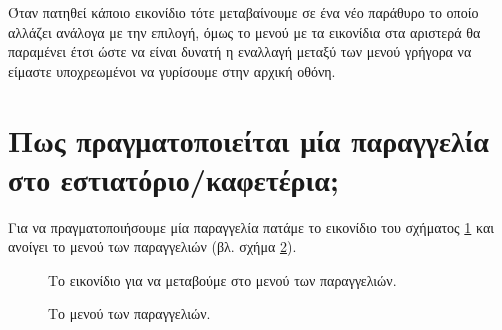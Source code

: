 \documentclass[a4paper,titlepage,twoside,12pt,leqno]{article}
\begin{document}

Όταν πατηθεί κάποιο εικονίδιο τότε μεταβαίνουμε σε ένα νέο παράθυρο το οποίο αλλάζει ανάλογα με την επιλογή, όμως το μενού με τα εικονίδια στα αριστερά θα παραμένει έτσι ώστε να είναι δυνατή η εναλλαγή μεταξύ των μενού γρήγορα να είμαστε υποχρεωμένοι να γυρίσουμε στην αρχική οθόνη.


\section{Πως πραγματοποιείται μία παραγγελία στο εστιατόριο/καφετέρια;}

Για να πραγματοποιήσουμε μία παραγγελία πατάμε το εικονίδιο του σχήματος \ref{fig:icon:order} και ανοίγει το μενού των παραγγελιών (βλ. σχήμα \ref{fig:menu:order-food}).

\begin{figure}
\begin{center}
\caption{Το εικονίδιο για να μεταβούμε στο μενού των παραγγελιών.}
\label{fig:icon:order}
\end{center}
\end{figure}

\begin{figure}
\begin{center}
\caption{Το μενού των παραγγελιών.}
\label{fig:menu:order-food}
\end{center}
\end{figure}
\end{document}
